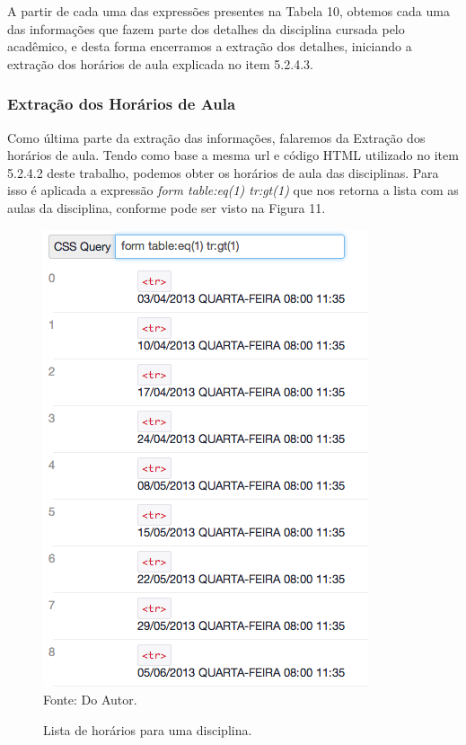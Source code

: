 
A partir de cada uma das expressões presentes na Tabela 10, obtemos cada uma das informações que fazem parte dos detalhes da disciplina cursada pelo acadêmico, e desta forma encerramos a extração dos detalhes, iniciando a extração dos horários de aula explicada no item 5.2.4.3.

\subsubsection{Extração dos Horários de Aula}
Como última parte da extração das informações, falaremos da Extração dos horários de aula. Tendo como base a mesma url e código HTML utilizado no item 5.2.4.2 deste trabalho, podemos obter os horários de aula das disciplinas. Para isso é aplicada a expressão \emph{form table:eq(1) tr:gt(1)} que nos retorna a lista com as aulas da disciplina, conforme pode ser visto na Figura 11.

\begin{figure}[!htb]
     \centering
     \caption[Extração de Informações - Horários do Semestre]{Lista de horários para uma disciplina.}
     \includegraphics[scale=0.5]{imagens/listahorariossemestre.png}
     \\  Fonte: Do Autor.
\end{figure}


